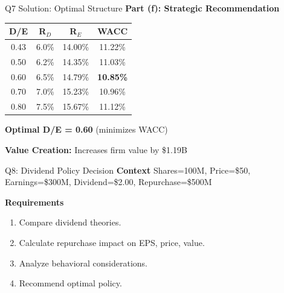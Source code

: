 \documentclass[aspectratio=169,10pt]{beamer}
\renewcommand{\small}{\fontsize{6pt}{7.5pt}\selectfont}
\renewcommand{\large}{\fontsize{8pt}{10pt}\selectfont}
\newcommand{\question}[1]{{\large\bfseries\color{crimson}#1}}
\begin{document}
	\begin{frame}{Q7 Solution: Optimal Structure}
		\question{Part (f): Strategic Recommendation}
		\small
		\begin{table}[h]
			\centering
			\begin{tabular}{|c|c|c|c|}
				\hline
				\textbf{D/E} & \textbf{R$_D$} & \textbf{R$_E$} & \textbf{WACC} \\
				\hline
				0.43 & 6.0\% & 14.00\% & 11.22\% \\
				0.50 & 6.2\% & 14.35\% & 11.03\% \\
				0.60 & 6.5\% & 14.79\% & \textbf{10.85\%} \\
				0.70 & 7.0\% & 15.23\% & 10.96\% \\
				0.80 & 7.5\% & 15.67\% & 11.12\% \\
				\hline
			\end{tabular}
		\end{table}
		
		\vspace{0.1cm}
		\textbf{Optimal D/E = 0.60} (minimizes WACC)
		
		\vspace{0.1cm}
		\textbf{Value Creation:} Increases firm value by \$1.19B
	\end{frame}
	
	\begin{frame}{Q8: Dividend Policy Decision}
		\question{Context}
		\small
		Shares=100M, Price=\$50, Earnings=\$300M, Dividend=\$2.00, Repurchase=\$500M
		
		\vspace{0.1cm}
		\question{Requirements}
		\begin{enumerate}
			\item Compare dividend theories.
			\item Calculate repurchase impact on EPS, price, value.
			\item Analyze behavioral considerations.
			\item Recommend optimal policy.
		\end{enumerate}
	\end{frame}
	
\end{document}
